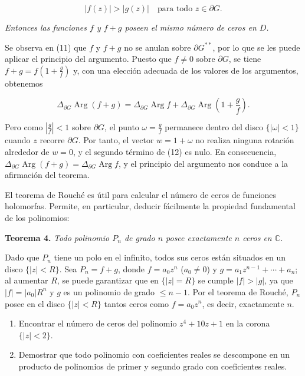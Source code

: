 \documentclass{article}
\begin{document}
\[|f(z)| > |g(z)| \quad \text{para todo } z \in \partial G. \tag{11}\]

\textit{Entonces las funciones \( f \) y \( f + g \) poseen el mismo número de ceros en \( D \).}

Se observa en (11) que \( f \) y \( f + g \) no se anulan sobre \( \partial G^{**} \), por lo que se les puede aplicar el principio del argumento. Puesto que \( f \neq 0 \) sobre \( \partial G \), se tiene \( f + g = f\left(1 + \frac{g}{f}\right) \) y, con una elección adecuada de los valores de los argumentos, obtenemos

\[\Delta_{\partial G} \operatorname{Arg}(f + g) = \Delta_{\partial G} \operatorname{Arg}f + \Delta_{\partial G} \operatorname{Arg}\left(1 + \frac{g}{f}\right). \tag{12}\]

Pero como \( \left|\frac{g}{f}\right| < 1 \) sobre \( \partial G \), el punto \( \omega = \frac{g}{f} \) permanece dentro del disco \( \{|\omega| < 1\} \) cuando \( z \) recorre \( \partial G \). Por tanto, el vector \( w = 1 + \omega \) no realiza ninguna rotación alrededor de \( w = 0 \), y el segundo término de (12) es nulo. En consecuencia, \( \Delta_{\partial G} \operatorname{Arg}(f + g) = \Delta_{\partial G} \operatorname{Arg}f \), y el principio del argumento nos conduce a la afirmación del teorema.

El teorema de Rouché es útil para calcular el número de ceros de funciones holomorfas. Permite, en particular, deducir fácilmente la propiedad fundamental de los polinomios:

\textbf{Teorema 4.} \textit{Todo polinomio \( P_n \) de grado \( n \) posee exactamente \( n \) ceros en \( \mathbb{C} \).}

Dado que \( P_n \) tiene un polo en el infinito, todos sus ceros están situados en un disco \( \{|z| < R\} \). Sea \( P_n = f + g \), donde \( f = a_0 z^n \) (\( a_0 \neq 0 \)) y \( g = a_1 z^{n-1} + \cdots + a_n \); al aumentar \( R \), se puede garantizar que en \( \{|z| = R\} \) se cumple \( |f| > |g| \), ya que \( |f| = |a_0| R^n \) y \( g \) es un polinomio de grado \( \leq n - 1 \). Por el teorema de Rouché, \( P_n \) posee en el disco \( \{|z| < R\} \) tantos ceros como \( f = a_0 z^n \), es decir, exactamente \( n \).

\begin{enumerate}
    \item Encontrar el número de ceros del polinomio \( z^4 + 10z + 1 \) en la corona \( \{|z| < 2\} \).
    \item Demostrar que todo polinomio con coeficientes reales se descompone en un producto de polinomios de primer y segundo grado con coeficientes reales.
\end{enumerate}
\end{document}
